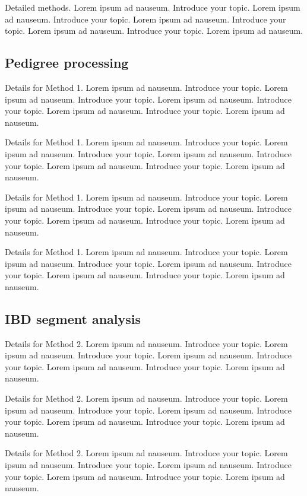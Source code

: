 \documentclass{bioinfo}
\begin{document}
Detailed methods. Lorem ipsum ad nauseum. Introduce your topic. Lorem
ipsum ad nauseum. Introduce your topic. Lorem ipsum ad nauseum.
Introduce your topic. Lorem ipsum ad nauseum. Introduce your topic.
Lorem ipsum ad nauseum.

\subsection{Pedigree processing}

Details for Method 1. Lorem ipsum ad nauseum. Introduce your topic.
Lorem ipsum ad nauseum. Introduce your topic. Lorem ipsum ad nauseum.
Introduce your topic. Lorem ipsum ad nauseum. Introduce your topic.
Lorem ipsum ad nauseum.

Details for Method 1. Lorem ipsum ad nauseum. Introduce your topic.
Lorem ipsum ad nauseum. Introduce your topic. Lorem ipsum ad nauseum.
Introduce your topic. Lorem ipsum ad nauseum. Introduce your topic.
Lorem ipsum ad nauseum.

Details for Method 1. Lorem ipsum ad nauseum. Introduce your topic.
Lorem ipsum ad nauseum. Introduce your topic. Lorem ipsum ad nauseum.
Introduce your topic. Lorem ipsum ad nauseum. Introduce your topic.
Lorem ipsum ad nauseum.

Details for Method 1. Lorem ipsum ad nauseum. Introduce your topic.
Lorem ipsum ad nauseum. Introduce your topic. Lorem ipsum ad nauseum.
Introduce your topic. Lorem ipsum ad nauseum. Introduce your topic.
Lorem ipsum ad nauseum.

\subsection{IBD segment analysis}

Details for Method 2. Lorem ipsum ad nauseum. Introduce your topic.
Lorem ipsum ad nauseum. Introduce your topic. Lorem ipsum ad nauseum.
Introduce your topic. Lorem ipsum ad nauseum. Introduce your topic.
Lorem ipsum ad nauseum.

Details for Method 2. Lorem ipsum ad nauseum. Introduce your topic.
Lorem ipsum ad nauseum. Introduce your topic. Lorem ipsum ad nauseum.
Introduce your topic. Lorem ipsum ad nauseum. Introduce your topic.
Lorem ipsum ad nauseum.

Details for Method 2. Lorem ipsum ad nauseum. Introduce your topic.
Lorem ipsum ad nauseum. Introduce your topic. Lorem ipsum ad nauseum.
Introduce your topic. Lorem ipsum ad nauseum. Introduce your topic.
Lorem ipsum ad nauseum.
\end{document}
